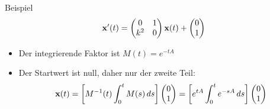 \begin{frame}{Beispiel}
  \begin{gather*}
    \mathbf{x}'(t) =
    \begin{pmatrix}
      0 & 1\\k^2 & 0      
    \end{pmatrix}\mathbf{x}(t) +
    \begin{pmatrix}
      0\\1
    \end{pmatrix}
  \end{gather*}
  \begin{itemize}
  \item Der integrierende Faktor ist $M(t) = e^{-tA}$
  \item Der Startwert ist null, daher  nur der zweite Teil:
    \begin{gather*}
      \mathbf{x}(t) = \left[M^{-1}(t) \int_{0}^t M(s)\,ds\right]
      \begin{pmatrix}
        0\\1
      \end{pmatrix}
      = \left[e^{tA} \int_0^t e^{-sA}\,ds\right]
      \begin{pmatrix}
        0\\1
      \end{pmatrix}
    \end{gather*}
  \end{itemize}
\end{frame}

